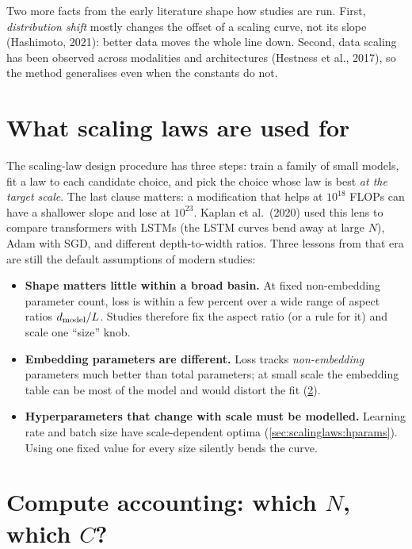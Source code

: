 Two more facts from the early literature shape how studies are run. First, \emph{distribution
shift} mostly changes the offset of a scaling curve, not its slope (Hashimoto, 2021): better data
moves the whole line down. Second, data scaling has been observed across modalities and
architectures (Hestness et al., 2017), so the method generalises even when the constants do not.

\section{What scaling laws are used for}\label{sec:scalinglaws:uses}

The scaling-law design procedure has three steps: train a family of small models, fit a law
to each candidate choice, and pick the choice whose law is best \emph{at the target scale}. The
last clause matters: a modification that helps at $10^{18}$ FLOPs can have a shallower slope and
lose at $10^{23}$. Kaplan et al.\ (2020) used this lens to compare transformers with LSTMs (the
LSTM curves bend away at large $N$), Adam with SGD, and different depth-to-width ratios. Three
lessons from that era are still the default assumptions of modern studies:
\begin{itemize}
  \item \textbf{Shape matters little within a broad basin.} At fixed non-embedding parameter
        count, loss is within a few percent over a wide range of aspect ratios $d_{\text{model}}/L$.
        Studies therefore fix the aspect ratio (or a rule for it) and scale one ``size'' knob.
  \item \textbf{Embedding parameters are different.} Loss tracks \emph{non-embedding}
        parameters much better than total parameters; at small scale the embedding table can be
        most of the model and would distort the fit (\cref{sec:scalinglaws:accounting}).
  \item \textbf{Hyperparameters that change with scale must be modelled.} Learning rate and
        batch size have scale-dependent optima (\cref{sec:scalinglaws:hparams}). Using one fixed
        value for every size silently bends the curve.
\end{itemize}

\section{Compute accounting: which $N$, which $C$?}\label{sec:scalinglaws:accounting}

